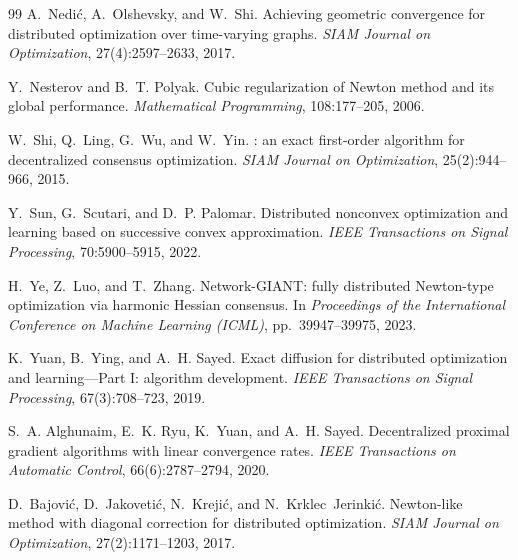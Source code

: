 \documentclass[11pt,a4paper]{article}
\begin{document}
\begin{thebibliography}{99}
		A.~Nedi{\'c}, A.~Olshevsky, and W.~Shi.
		\newblock Achieving geometric convergence for distributed optimization over time-varying graphs.
		\newblock \emph{SIAM Journal on Optimization}, 27(4):2597--2633, 2017.
		
		Y.~Nesterov and B.~T. Polyak.
		\newblock Cubic regularization of {N}ewton method and its global performance.
		\newblock \emph{Mathematical Programming}, 108:177--205, 2006.
		
		W.~Shi, Q.~Ling, G.~Wu, and W.~Yin.
		: an exact first-order algorithm for decentralized consensus optimization.
		\newblock \emph{SIAM Journal on Optimization}, 25(2):944--966, 2015.
		
		Y.~Sun, G.~Scutari, and D.~P. Palomar.
		\newblock Distributed nonconvex optimization and learning based on successive convex approximation.
		\newblock \emph{IEEE Transactions on Signal Processing}, 70:5900--5915, 2022.
		
		H.~Ye, Z.~Luo, and T.~Zhang.
		\newblock Network-{GIANT}: fully distributed {N}ewton-type optimization via harmonic Hessian consensus.
		\newblock In \emph{Proceedings of the International Conference on Machine Learning (ICML)}, pp.~39947--39975, 2023.
		
		K.~Yuan, B.~Ying, and A.~H. Sayed.
		\newblock Exact diffusion for distributed optimization and learning---Part {I}: algorithm development.
		\newblock \emph{IEEE Transactions on Signal Processing}, 67(3):708--723, 2019.
		
		
		S.~A. Alghunaim, E.~K. Ryu, K.~Yuan, and A.~H. Sayed.
		\newblock Decentralized proximal gradient algorithms with linear convergence rates.
		\newblock \emph{IEEE Transactions on Automatic Control}, 66(6):2787--2794, 2020.
		
		D.~Bajovi{\'c}, D.~Jakoveti{\'c}, N.~Kre\-ji{\'c}, and N.~Krklec~Jerinki{\'c}.
		\newblock Newton-like method with diagonal correction for distributed optimization.
		\newblock \emph{SIAM Journal on Optimization}, 27(2):1171--1203, 2017.
		

\end{thebibliography}
\end{document}
